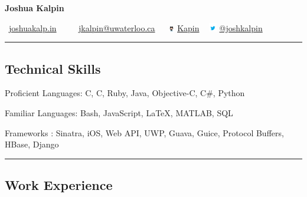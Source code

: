 \documentclass[10pt,letterpaper]{article}
\newenvironment{indentsection}[1]%
{\begin{list}{}%
	{\setlength{\leftmargin}{#1}}%
	\item[]%
}
{\end{list}}
\newcommand{\CPP}
{C\nolinebreak[4]\hspace{-.05em}\raisebox{.22ex}{\footnotesize\bf ++}}
\begin{document}
\pagestyle{headings}


\begin{center}
{\LARGE \textbf{Joshua Kalpin}}
\vspace{0.1cm}

\Mundus \ \href{http://joshuakalp.in}{joshuakalp.in} \ \textbullet
\ \ \Letter \ \href{mailto:jkalpin@uwaterloo.ca}{jkalpin@uwaterloo.ca} \ \textbullet
\ \includegraphics[height=6pt]{Resources/Octocat} 
\href{https://github.com/kapin}{Kapin} \ \textbullet
 \includegraphics[height=10pt]{Resources/twitter}
\href{https://twitter.com/joshkalpin}{@joshkalpin}
\end{center}

\hrule
\vspace{-0.4em}
\subsection*{Technical Skills}

\begin{indentsection}{\parindent}
\begin{description*}
	\item[Proficient Languages:]
	C, \CPP, Ruby, Java, Objective-C, C\#, Python
	\item[Familiar Languages:]
	Bash, JavaScript, \LaTeX, MATLAB, SQL
	\item[Frameworks]:
	Sinatra, iOS, Web API, UWP, Guava, Guice, Protocol Buffers, HBase, Django
\end{description*}
\end{indentsection}

\hrule
\vspace{-0.4em}
\subsection*{Work Experience}
\end{document}
